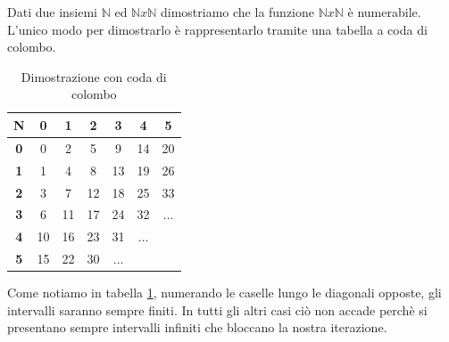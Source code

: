 \begin{exercise}
    
    Dati due insiemi $\mathbb{N}$ ed $\mathbb{N}x\mathbb{N}$ dimostriamo che la funzione $\mathbb{N}x\mathbb{N}$ è numerabile.
    L'unico modo per dimostrarlo è rappresentarlo tramite una tabella a coda di colombo. 
    
    \setlength{\tabcolsep}{13pt}
    \renewcommand{\arraystretch}{1}
    \begin{table}[ht]
        \centering
        \begin{tabular}{|c||c|c|c|c|c|c}
             \hline \textbf{N}&\textbf{0}&\textbf{1}&\textbf{2}&\textbf{3}&\textbf{4}&\textbf{5}\\\hline\hline
            \textbf{0}    &0&2&5&9&14&20\\\hline
            \textbf{1}    &1&4&8&13&19&26\\\hline
            \textbf{2}    &3&7&12&18&25&33\\\hline
            \textbf{3}    &6&11&17&24&32&...\\\hline
            \textbf{4}    &10&16&23&31&...&\\\hline
            \textbf{5}    &15&22&30&...&&
        \end{tabular}
        \caption{Dimostrazione con coda di colombo}
        \label{tab:numerab}
    \end{table}
    
    Come notiamo in tabella \ref{tab:numerab}, numerando le caselle lungo le diagonali opposte, gli intervalli saranno sempre finiti. In tutti gli altri casi ciò non accade perchè si presentano sempre intervalli infiniti che bloccano la nostra iterazione.
    
\end{exercise}


